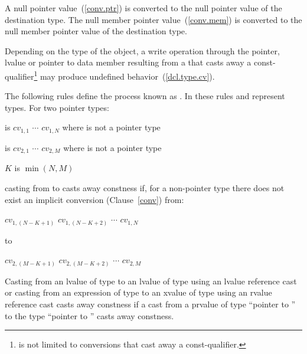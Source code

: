 \pnum
A null pointer value~(\ref{conv.ptr}) is converted to the null pointer
value of the destination type. The null member pointer
value~(\ref{conv.mem}) is converted to the null member pointer value of
the destination type.

\pnum
\enternote 
Depending on the type of the object, a write operation through the
pointer, lvalue or pointer to data member resulting from a
 that casts away a const-qualifier\footnote{
is not limited to conversions that cast away a
const-qualifier.}
may produce undefined behavior~(\ref{dcl.type.cv}).
\exitnote 

\pnum
The following rules define the process known as . In these rules  and 
represent types. For two pointer types:

\begin{indented}
 is $\mathit{cv}_{1,1}$ \tcode{*} $\cdots$
$\mathit{cv}_{1,N}$ \tcode{*} where  is not a pointer type
\end{indented}

\begin{indented}
 is $\mathit{cv}_{2,1}$ \tcode{*} $\cdots$
$\mathit{cv}_{2,M}$ \tcode{*} where  is not a pointer type
\end{indented}

\begin{indented}
$K$ is $\min (N,M)$
\end{indented}

casting from  to  casts away constness if, for a
non-pointer type  there does not exist an implicit conversion
(Clause~\ref{conv}) from:

\begin{indented}
$\mathit{cv}_{1,(N-K+1)}$ \tcode{*} $\mathit{cv}_{1,(N-K+2)}$
\tcode{*} $\cdots$ $\mathit{cv}_{1,N}$ \tcode{*}
\end{indented}

to

\begin{indented}
$\mathit{cv}_{2,(M-K+1)}$ \tcode{*} $\mathit{cv}_{2,(M-K+2)}$
\tcode{*} $\cdots$ $\mathit{cv}_{2,M}$ \tcode{*}
\end{indented}

\pnum
Casting from an lvalue of type  to an lvalue of type
 using an lvalue reference cast
or casting from an expression of type  to an xvalue of type  using
an rvalue reference cast
casts away constness if a cast from a prvalue of type ``pointer to '' to the type ``pointer to
'' casts away constness.

